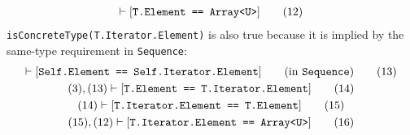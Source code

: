 \documentclass[../generics]{subfiles}
\begin{document}
\begin{example}
\begin{gather}
\vdash[\texttt{T.Element == Array<U>}]\tag{12}
\end{gather}
\texttt{isConcreteType(T.Iterator.Element)} is also true because it is implied by the same-type requirement in \texttt{Sequence}:
\begin{gather}
\vdash[\texttt{Self.Element == Self.Iterator.Element}]\qquad\mbox{(in \texttt{Sequence})}\tag{13}\\
(3),(13)\vdash[\texttt{T.Element == T.Iterator.Element}]\tag{14}\\
(14)\vdash[\texttt{T.Iterator.Element == T.Element}]\tag{15}\\
(15),(12)\vdash[\texttt{T.Iterator.Element == Array<U>}]\tag{16}
\end{gather}
\end{example}

\end{document}

